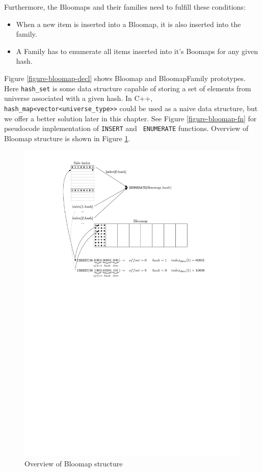 Furthermore, the Bloomaps and their families need to fulfill these conditions:

\begin{itemize}
	\item When a new item is inserted into a Bloomap, it is also inserted into
		the family.
	\item A Family has to enumerate all items inserted into it's Boomaps for any
		given hash.
\end{itemize}


Figure \ref{figure-bloomap-decl} shows Bloomap and BloomapFamily prototypes.
Here {\tt hash\_set} is some data structure capable of storing a set of
elements from universe associated with a given hash. In C++, {\tt
hash\_map<vector<universe\_type>>} could be used as a naive data structure, but
we offer a better solution later in this chapter. See Figure
\ref{figure-bloomap-fn} for pseudocode implementation of {\tt INSERT} and {\tt
ENUMERATE} functions. Overview of Bloomap structure is shown in Figure
\ref{figure-bloomap-overview}.

\begin{figure}[!ht]
\centering
	\includegraphics{./img/bloomap_overview.pdf}
	\caption{Overview of Bloomap structure}
	\label{figure-bloomap-overview}
\end{figure}



